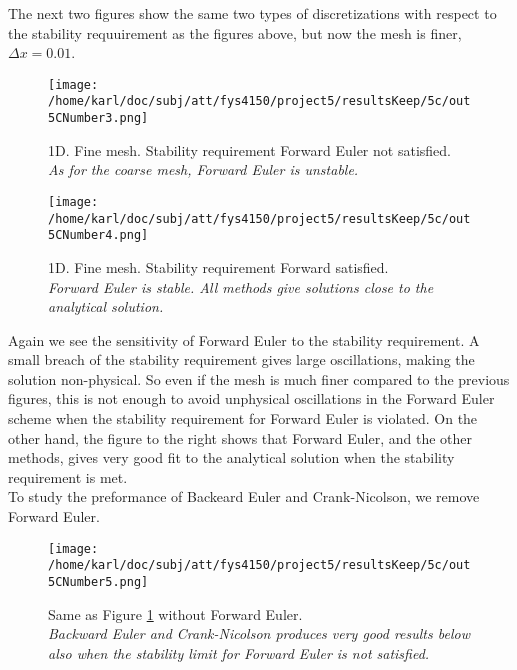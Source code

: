 \documentclass{article}
\begin{document}
The next two figures show the same two types of discretizations with respect to the stability requuirement as the figures above, but now the mesh is finer, $\Delta x= 0.01$.

\begin{minipage}{.45\textwidth} 
	\begin{figure}[H]
		\centering
		\texttt{[image: /home/karl/doc/subj/att/fys4150/project5/resultsKeep/5c/out5CNumber3.png]}
		\caption{1D. Fine mesh. Stability requirement Forward Euler not satisfied.\\ \textit{As for the coarse mesh, Forward Euler is unstable.}}
		\label{fig:fig3}
	\end{figure}
\end{minipage}\hfill
\begin{minipage}{.45\textwidth} 
	\begin{figure}[H]
		\centering
		\texttt{[image: /home/karl/doc/subj/att/fys4150/project5/resultsKeep/5c/out5CNumber4.png]}
		\caption{1D. Fine mesh. Stability requirement Forward satisfied.\\ \textit{Forward Euler is stable. All methods give solutions close to the analytical solution.}}
		\label{fig:1dFineMeshAll}
	\end{figure}
\end{minipage}\hfill
\vspace{2ex}

Again we see the sensitivity of Forward Euler to the stability requirement. A small breach of the stability requirement gives large oscillations, making the solution non-physical. So even if the mesh is much finer compared to the previous figures, this is not enough to avoid unphysical oscillations in the Forward Euler scheme when the stability requirement for Forward Euler is violated. On the other hand, the figure to the right shows that Forward Euler, and the other methods, gives very good fit to the analytical solution when the stability requirement is met.\\

To study the preformance of Backeard Euler and Crank-Nicolson, we remove Forward Euler.

\begin{figure}[H]
	\centering
	\texttt{[image: /home/karl/doc/subj/att/fys4150/project5/resultsKeep/5c/out5CNumber5.png]}
	\caption{Same as Figure \ref{fig:fig3} without Forward Euler. \\ \textit{Backward Euler and Crank-Nicolson produces very good results below also when the stability limit for Forward Euler is not satisfied.}}
	\label{1}
\end{figure}
\end{document}
